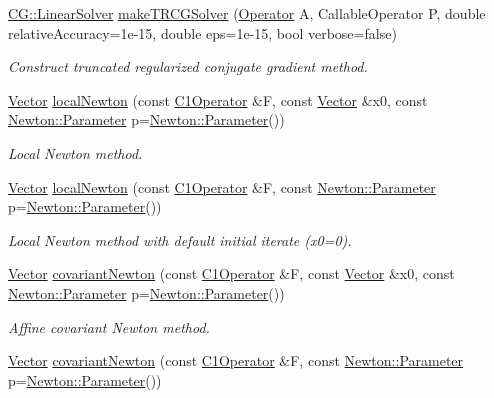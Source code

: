 \begin{DoxyCompactItemize}
\hyperlink{classSpacy_1_1CG_1_1LinearSolver}{C\+G\+::\+Linear\+Solver} \hyperlink{namespaceSpacy_a66f5afbc97e887274b28be9c94aa3103}{make\+T\+R\+C\+G\+Solver} (\hyperlink{classSpacy_1_1Operator}{Operator} A, Callable\+Operator P, double relative\+Accuracy=1e-\/15, double eps=1e-\/15, bool verbose=false)
\begin{DoxyCompactList}\small\item\em Construct truncated regularized conjugate gradient method. \end{DoxyCompactList}\item 
\hyperlink{classSpacy_1_1Vector}{Vector} \hyperlink{group__NewtonGroup_ga70230bc5f8b83684e04685b584967882}{local\+Newton} (const \hyperlink{classSpacy_1_1C1Operator}{C1\+Operator} \&F, const \hyperlink{classSpacy_1_1Vector}{Vector} \&x0, const \hyperlink{structSpacy_1_1Newton_1_1Parameter}{Newton\+::\+Parameter} p=\hyperlink{structSpacy_1_1Newton_1_1Parameter}{Newton\+::\+Parameter}())
\begin{DoxyCompactList}\small\item\em Local Newton method. \end{DoxyCompactList}\item 
\hyperlink{classSpacy_1_1Vector}{Vector} \hyperlink{group__NewtonGroup_gad86d75d93e7d0307c492513c98c48fed}{local\+Newton} (const \hyperlink{classSpacy_1_1C1Operator}{C1\+Operator} \&F, const \hyperlink{structSpacy_1_1Newton_1_1Parameter}{Newton\+::\+Parameter} p=\hyperlink{structSpacy_1_1Newton_1_1Parameter}{Newton\+::\+Parameter}())
\begin{DoxyCompactList}\small\item\em Local Newton method with default initial iterate (x0=0). \end{DoxyCompactList}\item 
\hyperlink{classSpacy_1_1Vector}{Vector} \hyperlink{group__NewtonGroup_ga0949f3b48cdec1915b947e716b56d707}{covariant\+Newton} (const \hyperlink{classSpacy_1_1C1Operator}{C1\+Operator} \&F, const \hyperlink{classSpacy_1_1Vector}{Vector} \&x0, const \hyperlink{structSpacy_1_1Newton_1_1Parameter}{Newton\+::\+Parameter} p=\hyperlink{structSpacy_1_1Newton_1_1Parameter}{Newton\+::\+Parameter}())
\begin{DoxyCompactList}\small\item\em Affine covariant Newton method. \end{DoxyCompactList}\item 
\hyperlink{classSpacy_1_1Vector}{Vector} \hyperlink{group__NewtonGroup_ga1564e156effda6be6636e29333e8250d}{covariant\+Newton} (const \hyperlink{classSpacy_1_1C1Operator}{C1\+Operator} \&F, const \hyperlink{structSpacy_1_1Newton_1_1Parameter}{Newton\+::\+Parameter} p=\hyperlink{structSpacy_1_1Newton_1_1Parameter}{Newton\+::\+Parameter}())

\end{DoxyCompactItemize}
